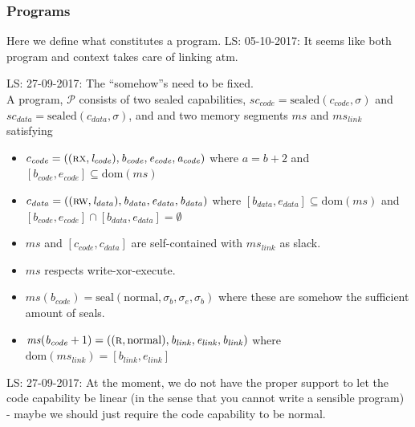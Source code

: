 \documentclass[a3paper]{article}
\newcommand\lau[1]{{\color{purple} \sf \footnotesize {LS: #1}}\\}
\newcommand{\dom}{\mathrm{dom}}
\newcommand{\shareddom}[1]{\mathrm{#1}}
\newcommand{\lin}{\var{l}}
\newcommand{\seal}[1]{\shareddom{seal}(#1)}
\newcommand{\sealed}[1]{\shareddom{sealed}(#1)}
\newcommand{\program}{\mathscr{P}}
\newcommand{\var}[1]{\mathit{#1}}
\newcommand{\ms}{\var{ms}}
\newcommand{\link}{\var{link}}
\newcommand{\data}{\var{data}}
\newcommand{\code}{\var{code}}
\newcommand{\vsc}{\var{sc}}
\newcommand{\baddr}{\var{b}}
\newcommand{\eaddr}{\var{e}}
\newcommand{\aaddr}{\var{a}}
\newcommand{\plainlinearity}[1]{\mathrm{#1}}
\newcommand{\normal}{\plainlinearity{normal}}
\newcommand{\plainperm}[1]{\textsc{#1}}
\newcommand{\rx}{\plainperm{rx}}
\newcommand{\rw}{\plainperm{rw}}
\newcommand{\readonly}{\plainperm{r}}
\newcommand{\ro}{\readonly}
\begin{document}
\subsubsection{Programs}
Here we define what constitutes a program.
\lau{05-10-2017: It seems like both program and context takes care of linking atm.}
\begin{definition}
  \label{def:program}
  \lau{27-09-2017: The ``somehow''s need to be fixed.}
  A program, $\program$ consists of two sealed capabilities, $\vsc_\code = \sealed{c_\code,\sigma}$ and $\vsc_\data = \sealed{c_\data,\sigma}$, and and two memory segments $\ms$ and $\ms_\link$ satisfying
  \begin{itemize}
  \item $c_\code = ((\rx,\lin_\code),\baddr_\code,\eaddr_\code,\aaddr_\code)$ where $\aaddr = \baddr + 2$ and $[\baddr_\code,\eaddr_\code]\subseteq \dom(\ms)$
  \item $c_\data = ((\rw,\lin_\data),\baddr_\data,\eaddr_\data,\baddr_\data)$ where $[\baddr_\data,\eaddr_\data] \subseteq \dom(\ms)$ and $[\baddr_\code,\eaddr_\code] \cap [\baddr_\data,\eaddr_\data] = \emptyset$
  \item $\ms$ and $[c_\code,c_\data]$ are self-contained with $\ms_\link$ as slack.
  \item $\ms$ respects write-xor-execute.
  \item $\ms(\baddr_\code) = \seal{\normal,\sigma_\baddr,\sigma_\eaddr,\sigma_\baddr}$ where these are somehow the sufficient amount of seals.
  \item $\ms(\baddr_\code+1) = ((\ro,\normal),\baddr_\link, \eaddr_\link, \baddr_\link)$ where $\dom(\ms_\link) = [\baddr_\link, \eaddr_\link]$
  \end{itemize}
\end{definition}
\lau{27-09-2017: At the moment, we do not have the proper support to let the code capability be linear (in the sense that you cannot write a sensible program) - maybe we should just require the code capability to be normal.}
\end{document}
